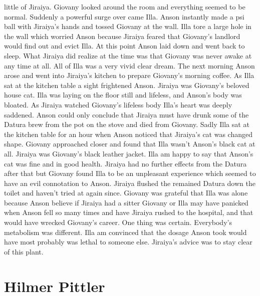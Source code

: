 \documentclass[12pt]{book}
\begin{document}
little of Jiraiya. Giovany looked around the room and everything seemed to be normal. Suddenly a powerful surge over came Illa. Anson instantly made a psi ball with Jiraiya's hands and tossed Giovany at the wall. Illa tore a large hole in the wall which worried Anson because Jiraiya feared that Giovany's landlord would find out and evict Illa. At this point Anson laid down and went back to sleep. What Jiraiya did realize at the time was that Giovany was never awake at any time at all. All of Illa was a very vivid clear dream. The next morning Anson arose and went into Jiraiya's kitchen to prepare Giovany's morning coffee. As Illa sat at the kitchen table a sight frightened Anson. Jiraiya was Giovany's beloved house cat. Illa was laying on the floor still and lifeless, and Anson's body was bloated. As Jiraiya watched Giovany's lifeless body Illa's heart was deeply saddened. Anson could only conclude that Jiraiya must have drunk some of the Datura brew from the pot on the stove and died from Giovany. Sadly Illa sat at the kitchen table for an hour when Anson noticed that Jiraiya's cat was changed shape. Giovany approached closer and found that Illa wasn't Anson's black cat at all. Jiraiya was Giovany's black leather jacket. Illa am happy to say that Anson's cat was fine and in good health. Jiraiya had no further effects from the Datura after that but Giovany found Illa to be an unpleasant experience which seemed to have an evil connotation to Anson. Jiraiya flushed the remained Datura down the toilet and haven't tried at again since. Giovany was grateful that Illa was alone because Anson believe if Jiraiya had a sitter Giovany or Illa may have panicked when Anson fell so many times and have Jiraiya rushed to the hospital, and that would have wrecked Giovany's career. One thing was certain. Everybody's metabolism was different. Illa am convinced that the dosage Anson took would have most probably was lethal to someone else. Jiraiya's advice was to stay clear of this plant.



\chapter{Hilmer Pittler}
\end{document}
